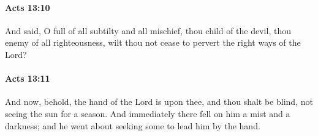 		\paragraph{Acts 13:10} %
			\label{ACTS-13-10}

			And said, O full of all subtilty and all mischief, thou child of the devil, thou enemy of all righteousness, wilt thou not cease to pervert the right ways of the Lord?

			\begin{framed}
			\scriptsize
				\begin{compactdesc}
					\item[SBLG] 
				\end{compactdesc}
			\end{framed}

		\paragraph{Acts 13:11} %
			\label{ACTS-13-11}

			And now, behold, the hand of the Lord is upon thee, and thou shalt be blind, not seeing the sun for a season.  And immediately there fell on him a mist and a darkness; and he went about seeking some to lead him by the hand.

